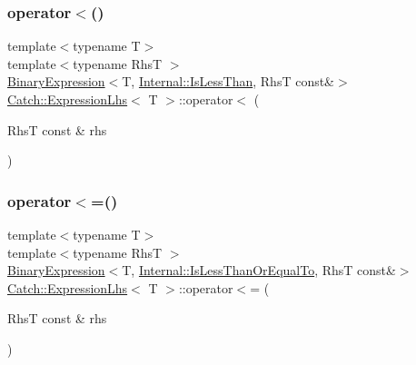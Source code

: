 \subsubsection{\texorpdfstring{operator$<$()}{operator<()}}
{\footnotesize\ttfamily template$<$typename T$>$ \\
template$<$typename RhsT $>$ \\
\mbox{\hyperlink{class_catch_1_1_binary_expression}{Binary\+Expression}}$<$T, \mbox{\hyperlink{namespace_catch_1_1_internal_ae3f96598a7858155750bf38e7295d83eabbbfc41706595e50acbefa8408004b93}{Internal\+::\+Is\+Less\+Than}}, RhsT const\&$>$ \mbox{\hyperlink{class_catch_1_1_expression_lhs}{Catch\+::\+Expression\+Lhs}}$<$ T $>$\+::operator$<$ (\begin{DoxyParamCaption}\item[{RhsT const \&}]{rhs }\end{DoxyParamCaption})\hspace{0.3cm}{\ttfamily [inline]}}

\mbox{\label{class_catch_1_1_expression_lhs_a1d10974a581c67cc400cd6cdd36b0000}} 
\subsubsection{\texorpdfstring{operator$<$=()}{operator<=()}}
{\footnotesize\ttfamily template$<$typename T$>$ \\
template$<$typename RhsT $>$ \\
\mbox{\hyperlink{class_catch_1_1_binary_expression}{Binary\+Expression}}$<$T, \mbox{\hyperlink{namespace_catch_1_1_internal_ae3f96598a7858155750bf38e7295d83ea0db29a4c3f1e81260036c5e27a8407fd}{Internal\+::\+Is\+Less\+Than\+Or\+Equal\+To}}, RhsT const\&$>$ \mbox{\hyperlink{class_catch_1_1_expression_lhs}{Catch\+::\+Expression\+Lhs}}$<$ T $>$\+::operator$<$= (\begin{DoxyParamCaption}\item[{RhsT const \&}]{rhs }\end{DoxyParamCaption})\hspace{0.3cm}{\ttfamily [inline]}}

\mbox{\label{class_catch_1_1_expression_lhs_a60d50fe8adcaabcb7c93747ddbae5993}} 
